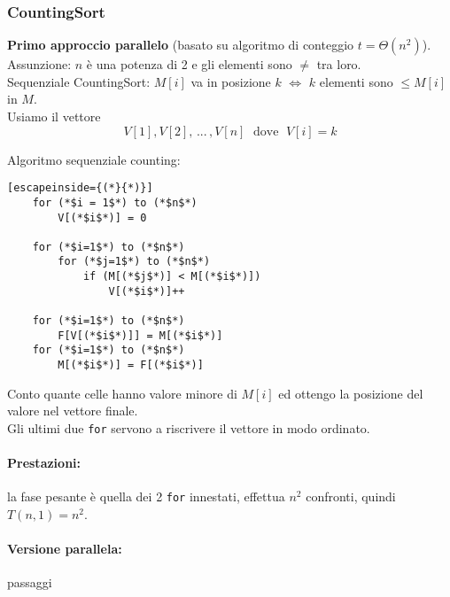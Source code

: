 \newpage

\subsubsection{CountingSort}

\textbf{Primo approccio parallelo } (basato su algoritmo di conteggio $t = \Theta (n^2)$).\\

Assunzione: $n$ è una potenza di 2 e gli elementi sono $\neq$ tra loro.\\

Sequenziale CountingSort: $M[i]$ va in posizione $k$ $\Leftrightarrow$ $k$ elementi sono $\leq M[i]$ in $M$.\\

Usiamo il vettore 
$$ V[1], V[2], \, ... \, , V[n] \; \text{ dove }\; V[i] = k $$

Algoritmo sequenziale counting:
\begin{lstlisting}[escapeinside={(*}{*)}]
	for (*$i = 1$*) to (*$n$*)
		V[(*$i$*)] = 0
	
	for (*$i=1$*) to (*$n$*)
		for (*$j=1$*) to (*$n$*)
			if (M[(*$j$*)] < M[(*$i$*)])
				V[(*$i$*)]++
	
	for (*$i=1$*) to (*$n$*)
		F[V[(*$i$*)]] = M[(*$i$*)]
	for (*$i=1$*) to (*$n$*)
		M[(*$i$*)] = F[(*$i$*)]
\end{lstlisting}

Conto quante celle hanno valore minore di $M[i]$ ed ottengo la posizione del valore nel vettore finale.\\
Gli ultimi due \texttt{for} servono a riscrivere il vettore in modo ordinato.\\


\paragraph{Prestazioni:} la fase pesante è quella dei 2 \texttt{for} innestati, effettua $n^2$ confronti, quindi $T(n,1) = n^2$.\\

\newpage

\paragraph{Versione parallela:} passaggi

